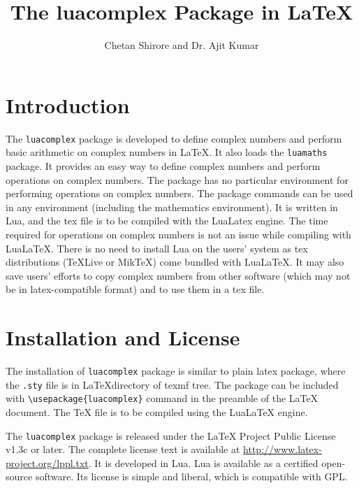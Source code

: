 \documentclass{article}
\begin{document}
\title{The luacomplex Package in LaTeX}
\author{Chetan Shirore and Dr. Ajit Kumar}
\maketitle
\section{Introduction}\label{section:introduction}
The  \verb|luacomplex| package is developed to define complex numbers and perform basic arithmetic on complex numbers in LaTeX. It also loads the \texttt{luamaths} package. It provides an easy way to define complex numbers and perform operations on complex numbers. The package has no particular environment for performing operations on complex numbers. The package commands can be used in any environment (including the mathematics environment). It is written in Lua, and the tex file is to be compiled with the LuaLatex engine. The time required for operations on complex numbers is not an issue while compiling with LuaLaTeX. There is no need to install Lua on the users' system as tex distributions (TeXLive or MikTeX) come bundled with LuaLaTeX. It may also save users' efforts to copy complex numbers from other software (which may not be in latex-compatible format) and to use them in a tex file. 

\section{Installation and License}

The installation of \verb|luacomplex| package is similar to plain latex package, where the \texttt{.sty} file is in \LaTeX directory of texmf tree. The package can be included with \verb|\usepackage{luacomplex}| command in the preamble of the LaTeX document. The TeX file is to be compiled using the LuaLaTeX engine.

The \verb|luacomplex| package is released under the LaTeX Project Public License v1.3c or later. The complete license text is available at \url{http://www.latex-project.org/lppl.txt}. It is developed in Lua.  Lua is available as a certified open-source software. Its license is simple and liberal, which is compatible with GPL.
\end{document}
